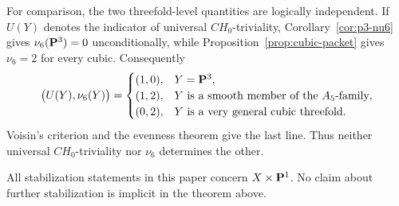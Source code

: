 For comparison, the two threefold-level quantities are logically
independent.  If \(U(Y)\) denotes the indicator of universal
\(CH_0\)-triviality, Corollary~\ref{cor:p3-nu6} gives
\(\nu_6(\mathbf P^3)=0\) unconditionally, while
Proposition~\ref{prop:cubic-packet} gives \(\nu_6=2\) for every cubic.
Consequently
\[
 \bigl(U(Y),\nu_6(Y)\bigr)=
 \begin{cases}
  (1,0),&Y=\mathbf P^3,\\
  (1,2),&Y\text{ is a smooth member of the }A_5\text{-family},\\
  (0,2),&Y\text{ is a very general cubic threefold}.
 \end{cases}
\]
Voisin's criterion \cite[Corollary~4.4]{Voisin} and the evenness theorem
\cite[Theorem~1.3 and Corollary~1.4]{EdGFS} give the last line.  Thus neither
universal \(CH_0\)-triviality nor \(\nu_6\) determines the other.

All stabilization statements in this paper concern \(X\times\mathbf P^1\).  No
claim about further stabilization is implicit in the theorem above.
